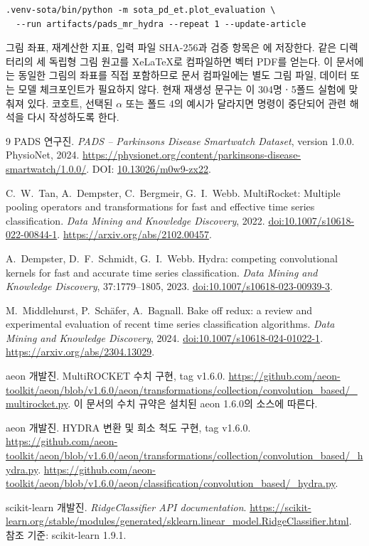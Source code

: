 \documentclass[11pt,a4paper]{article}
\newcommand{\code}[1]{\texttt{\detokenize{#1}}}
\numberwithin{equation}{section}
\begin{document}
\begin{lstlisting}
.venv-sota/bin/python -m sota_pd_et.plot_evaluation \
  --run artifacts/pads_mr_hydra --repeat 1 --update-article
\end{lstlisting}

그림 좌표, 재계산한 지표, 입력 파일 SHA-256과 검증 항목은
\code{output/figures/pads_mr_hydra/evaluation_data.json}에 저장한다.
같은 디렉터리의 세 독립형 그림 원고를 XeLaTeX로 컴파일하면 벡터 PDF를 얻는다.
이 문서에는 동일한 그림의 좌표를 직접 포함하므로
문서 컴파일에는 별도 그림 파일, 데이터 또는 모델 체크포인트가 필요하지 않다.
현재 재생성 문구는 이 304명ㆍ5폴드 실험에 맞춰져 있다.
코호트, 선택된 \(\alpha\) 또는 폴드 4의 예시가 달라지면
명령이 중단되어 관련 해석을 다시 작성하도록 한다.

\clearpage
\begin{thebibliography}{9}\small
{}
PADS 연구진. \emph{PADS -- Parkinsons Disease Smartwatch Dataset},
version 1.0.0. PhysioNet, 2024.
\url{https://physionet.org/content/parkinsons-disease-smartwatch/1.0.0/}.
DOI: \href{https://doi.org/10.13026/m0w9-zx22}{10.13026/m0w9-zx22}.

C.~W.~Tan, A.~Dempster, C.~Bergmeir, G.~I.~Webb.
MultiRocket: Multiple pooling operators and transformations for fast and
effective time series classification.
\emph{Data Mining and Knowledge Discovery}, 2022.
\href{https://doi.org/10.1007/s10618-022-00844-1}{doi:10.1007/s10618-022-00844-1}.
\url{https://arxiv.org/abs/2102.00457}.

A.~Dempster, D.~F.~Schmidt, G.~I.~Webb.
Hydra: competing convolutional kernels for fast and accurate time series classification.
\emph{Data Mining and Knowledge Discovery}, 37:1779--1805, 2023.
\href{https://doi.org/10.1007/s10618-023-00939-3}{doi:10.1007/s10618-023-00939-3}.

M.~Middlehurst, P.~Sch\"afer, A.~Bagnall.
Bake off redux: a review and experimental evaluation of recent time series
classification algorithms. \emph{Data Mining and Knowledge Discovery}, 2024.
\href{https://doi.org/10.1007/s10618-024-01022-1}{doi:10.1007/s10618-024-01022-1}.
\url{https://arxiv.org/abs/2304.13029}.

aeon 개발진. MultiROCKET 수치 구현, tag v1.6.0.
\url{https://github.com/aeon-toolkit/aeon/blob/v1.6.0/aeon/transformations/collection/convolution_based/_multirocket.py}.
이 문서의 수치 규약은 설치된 aeon 1.6.0의 소스에 따른다.

aeon 개발진. HYDRA 변환 및 희소 척도 구현, tag v1.6.0.
\url{https://github.com/aeon-toolkit/aeon/blob/v1.6.0/aeon/transformations/collection/convolution_based/_hydra.py}.
\url{https://github.com/aeon-toolkit/aeon/blob/v1.6.0/aeon/classification/convolution_based/_hydra.py}.

scikit-learn 개발진. \emph{RidgeClassifier API documentation}.
\url{https://scikit-learn.org/stable/modules/generated/sklearn.linear_model.RidgeClassifier.html}.
참조 기준: scikit-learn 1.9.1.
\end{thebibliography}
\end{document}
